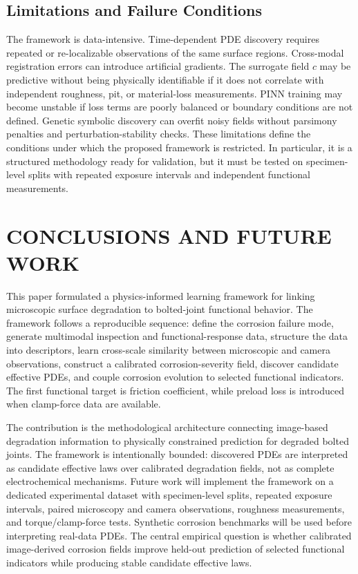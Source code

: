 \documentclass[colorlinks,upint,subscriptcorrection,varvw,hyphenate,balance]{asmeconf}
\begin{document}
\subsection{Limitations and Failure Conditions}
The framework is data-intensive. Time-dependent PDE discovery requires
repeated or re-localizable observations of the same surface regions.
Cross-modal registration errors can introduce artificial gradients. The
surrogate field $c$ may be predictive without being physically identifiable if
it does not correlate with independent roughness, pit, or material-loss
measurements. PINN training may become unstable if loss terms are poorly
balanced or boundary conditions are not defined. Genetic symbolic discovery can overfit noisy fields without parsimony penalties and perturbation-stability checks. These limitations define the conditions under which the proposed framework is restricted. In particular, it is a structured methodology ready for validation, but it must be tested on specimen-level splits with repeated exposure intervals and independent functional measurements.

\section{CONCLUSIONS AND FUTURE WORK}
This paper formulated a physics-informed learning framework for linking
microscopic surface degradation to bolted-joint functional behavior. The
framework follows a reproducible sequence: define the corrosion failure mode,
generate multimodal inspection and functional-response data, structure the data
into descriptors, learn cross-scale similarity between microscopic and camera
observations, construct a calibrated corrosion-severity field, discover
candidate effective PDEs, and couple corrosion evolution to selected
functional indicators. The first functional target is friction coefficient,
while preload loss is introduced when clamp-force data are available.

The contribution is the methodological architecture connecting image-based
degradation information to physically constrained prediction for degraded
bolted joints. The framework is intentionally bounded: discovered PDEs are
interpreted as candidate effective laws over calibrated degradation fields, not
as complete electrochemical mechanisms. Future work will implement the
framework on a dedicated experimental dataset with specimen-level splits,
repeated exposure intervals, paired microscopy and camera observations,
roughness measurements, and torque/clamp-force tests. Synthetic corrosion
benchmarks will be used before interpreting real-data PDEs. The central
empirical question is whether calibrated image-derived corrosion fields
improve held-out prediction of selected functional indicators while producing
stable candidate effective laws.
\end{document}
